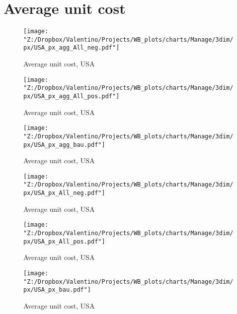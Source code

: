 \documentclass[12pt, letterpaper]{article}
\begin{document}
\newpage
\section{Average unit cost}
\begin{figure}[H]
\caption{Average unit cost, USA}
\label{fig_USA_px_agg_All_neg}
\centering
\texttt{[image: "Z:/Dropbox/Valentino/Projects/WB\_plots/charts/Manage/3dim/px/USA\_px\_agg\_All\_neg.pdf"]}
\end{figure}
\begin{figure}[H]
\caption{Average unit cost, USA}
\label{fig_USA_px_agg_All_pos}
\centering
\texttt{[image: "Z:/Dropbox/Valentino/Projects/WB\_plots/charts/Manage/3dim/px/USA\_px\_agg\_All\_pos.pdf"]}
\end{figure}
\begin{figure}[H]
\caption{Average unit cost, USA}
\label{fig_USA_px_agg_bau}
\centering
\texttt{[image: "Z:/Dropbox/Valentino/Projects/WB\_plots/charts/Manage/3dim/px/USA\_px\_agg\_bau.pdf"]}
\end{figure}
\begin{figure}[H]
\caption{Average unit cost, USA}
\label{fig_USA_px_All_neg}
\centering
\texttt{[image: "Z:/Dropbox/Valentino/Projects/WB\_plots/charts/Manage/3dim/px/USA\_px\_All\_neg.pdf"]}
\end{figure}
\begin{figure}[H]
\caption{Average unit cost, USA}
\label{fig_USA_px_All_pos}
\centering
\texttt{[image: "Z:/Dropbox/Valentino/Projects/WB\_plots/charts/Manage/3dim/px/USA\_px\_All\_pos.pdf"]}
\end{figure}
\begin{figure}[H]
\caption{Average unit cost, USA}
\label{fig_USA_px_bau}
\centering
\texttt{[image: "Z:/Dropbox/Valentino/Projects/WB\_plots/charts/Manage/3dim/px/USA\_px\_bau.pdf"]}
\end{figure}
\end{document}
